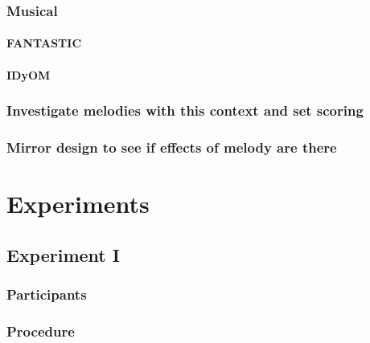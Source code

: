 \documentclass[]{book}
\let\oldparagraph\paragraph
\renewcommand{\paragraph}[1]{\oldparagraph{#1}\mbox{}}
\theoremstyle{definition}
\theoremstyle{definition}
\theoremstyle{definition}
\theoremstyle{remark}
\begin{document}
\hypertarget{musical}{%
\subsubsection{Musical}\label{musical}}

\hypertarget{fantastic-1}{%
\paragraph{FANTASTIC}\label{fantastic-1}}

\hypertarget{idyom}{%
\paragraph{IDyOM}\label{idyom}}

\hypertarget{investigate-melodies-with-this-context-and-set-scoring}{%
\subsubsection{Investigate melodies with this context and set
scoring}\label{investigate-melodies-with-this-context-and-set-scoring}}

\hypertarget{mirror-design-to-see-if-effects-of-melody-are-there}{%
\subsubsection{Mirror design to see if effects of melody are
there}\label{mirror-design-to-see-if-effects-of-melody-are-there}}

\hypertarget{experiments-1}{%
\section{Experiments}\label{experiments-1}}

\hypertarget{experiment-i}{%
\subsection{Experiment I}\label{experiment-i}}

\hypertarget{participants-1}{%
\subsubsection{Participants}\label{participants-1}}

\hypertarget{procedure-1}{%
\subsubsection{Procedure}\label{procedure-1}}
\end{document}
